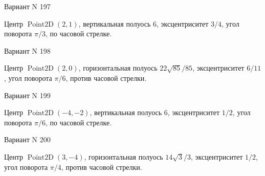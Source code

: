 \documentclass[11pt]{report}
\begin{document}
Вариант N 197

Центр $\operatorname{Point2D}\left(2, 1\right)$, вертикальная полуось $6$, эксцентриситет $3 / 4$, угол поворота $\pi / 3$, по часовой стрелке.

Вариант N 198

Центр $\operatorname{Point2D}\left(2, 0\right)$, горизонтальная полуось $22 \sqrt{85} / 85$, эксцентриситет $6 / 11$, угол поворота $\pi / 6$, против часовой стрелки.

Вариант N 199

Центр $\operatorname{Point2D}\left(-4, -2\right)$, вертикальная полуось $6$, эксцентриситет $1 / 2$, угол поворота $\pi / 6$, по часовой стрелке.

Вариант N 200

Центр $\operatorname{Point2D}\left(3, -4\right)$, горизонтальная полуось $14 \sqrt{3} / 3$, эксцентриситет $1 / 2$, угол поворота $\pi / 4$, против часовой стрелки.
\end{document}
